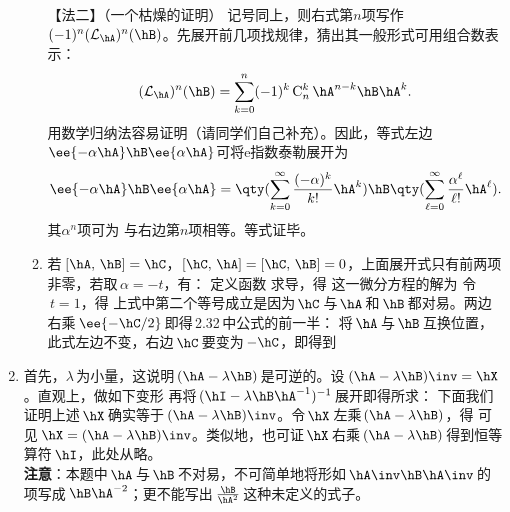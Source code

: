 \begin{enumerate}[label=2.\arabic*]
\begin{enumerate}[label=(\arabic*)]
【法二】（一个枯燥的证明）%
记号同上，则右式第$n$项写作$(-1)^n(\mathcal{L}_{\hA})^n(\hB)$。先展开前几项找规律，猜出其一般形式可用组合数表示：
\[(\mathcal{L}_{\hA})^n(\hB) = \sum_{k=0}^{n}(-1)^k \,\mathrm{C}_n^k\, \hA^{n-k}\hB\hA^{k}.\]
用数学归纳法容易证明（请同学们自己补充）。因此，等式左边$\ee{-\alpha\hA}\hB\ee{\alpha\hA}$可将e指数泰勒展开为
\[\ee{-\alpha\hA}\hB\ee{\alpha\hA} = \qty(\sum_{k=0}^{\infty}\frac{(-\alpha)^k}{k!}\hA^k)\hB \qty(\sum_{\ell=0}^{\infty}\frac{\alpha^\ell}{\ell!}\hA^\ell).\]
其$\alpha^n$项可为
与右边第$n$项相等。等式证毕。
\item
若$\,[\hA,\,\hB]=\hC$，$[\hC,\,\hA]=[\hC,\,\hB]=0$，上面展开式只有前两项非零，若取$\,\alpha=-t$，有：
定义函数
求导，得
这一微分方程的解为
令$\,t=1$，得
上式中第二个等号成立是因为$\,\hC\,$与$\,\hA\,$和$\,\hB\,$都对易。两边右乘$\,\ee{-\hC/2}\,$即得\,2.32\,中公式的前一半：
将$\,\hA\,$与$\,\hB\,$互换位置，此式左边不变，右边$\,\hC\,$要变为$\,-\hC$，即得到
\end{enumerate}

\item
首先，$\lambda\,$为小量，这说明$\,(\hA-\lambda\hB)\,$是可逆的。设$\,(\hA-\lambda\hB)\inv=\hX$。直观上，做如下变形
\alg{\hX=((\hI-\lambda\hB\hA\inv)\hA)\inv=\hA\inv(\hI-\lambda\hB\hA\inv)\inv}
再将$\,(\hI-\lambda\hB\hA^{-1})^{-1}\,$展开即得所求：
下面我们证明上述$\,\hX\,$确实等于$\,(\hA-\lambda\hB)\inv$。令$\,\hX\,$左乘$\,(\hA-\lambda\hB)$，得
可见$\,\hX=(\hA-\lambda\hB)\inv$。类似地，也可证$\,\hX\,$右乘$\,(\hA-\lambda\hB)\,$得到恒等算符$\,\hI$，此处从略。\\
{\color{red}\textbf{注意}：本题中$\,\hA\,$与$\,\hB\,$不对易，不可简单地将形如$\,\hA\inv\hB\hA\inv\,$的项写成$\,\hB\hA^{-2}$；更不能写出$\,\frac{\hB}{\hA^{2}}\,$这种未定义的式子。}


\end{enumerate}
